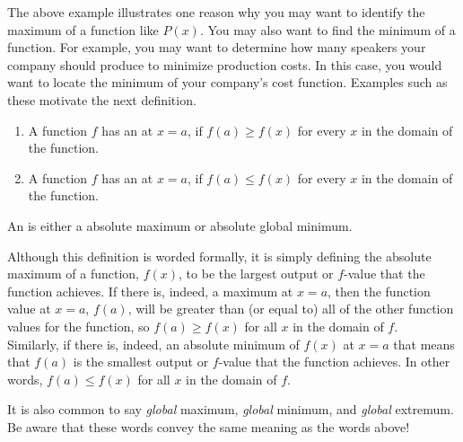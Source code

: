 \documentclass{ximera}
\begin{document}
The above example illustrates one reason why you may want to identify the maximum of a function like $P(x)$.  You may also want to find the minimum of a function.  For example, you may want to determine how many speakers your company should produce to minimize production costs.  In this case, you would want to locate the minimum of your company's cost function.  Examples such as these motivate the next definition. 

\begin{definition}\hfil{}
\begin{enumerate}
\item A function $f$ has an  at $x=a$, if $f(a)\ge
  f(x)$ for every $x$ in the domain of the function.
\item A function $f$ has an  at $x=a$, if $f(a)\le
  f(x)$ for every $x$ in the domain of the function.
\end{enumerate} 
An  is either a
absolute maximum or absolute global minimum.  
\end{definition}

\begin{explanation}
Although this definition is worded formally, it is simply defining the absolute maximum of a function, $f(x)$, to be the largest output or $f$-value that the function achieves.  If there is, indeed, a maximum at $x=a$, then the function value at $x=a$, $f(a)$, will be greater than (or equal to) all of the other function values for the function, so $f(a) \geq f(x)$ for all $x$ in the domain of $f$.  \\

Similarly, if there is, indeed, an absolute minimum of $f(x)$ at $x=a$ that means that $f(a)$ is the smallest output or $f$-value that the function achieves.  In other words, $f(a) \leq f(x)$ for all $x$ in the domain of $f$. \\
\end{explanation}

\begin{warning}
It is also common to say \textit{global} maximum, \textit{global} minimum, and \textit{global} extremum.  Be aware that these words convey the same meaning as the words above! 
\end{warning}
\end{document}
